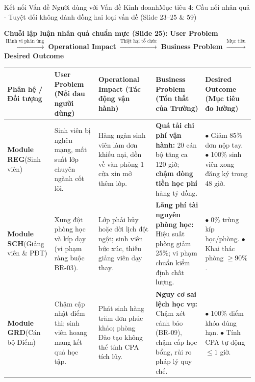 \documentclass[aspectratio=169, 10pt]{beamer}
\begin{document}
\begin{frame}[t]{Kết nối Vấn đề Người dùng với Vấn đề Kinh doanh}{Mục tiêu 4: Cầu nối nhân quả - Tuyệt đối không đánh đồng hai loại vấn đề (Slide 23--25 \& 59)}
  \vspace{-0.15cm}
  \begin{tcolorbox}[colback=NavyDark!5!white, colframe=NavyDark, arc=1mm, boxrule=0.5pt, left=2mm, right=2mm, top=1mm, bottom=1mm]
    \centering\scriptsize
    \textbf{Chuỗi lập luận nhân quả chuẩn mực (Slide 25):}\;
    {\color{NavyDark}\textbf{User Problem}} $\xrightarrow{\text{Hành vi phản ứng}}$ {\color{WarningAmber}\textbf{Operational Impact}} $\xrightarrow{\text{Thiệt hại tổ chức}}$ {\color{HustRed}\textbf{Business Problem}} $\xrightarrow{\text{Mục tiêu}}$ {\color{SecondaryTeal}\textbf{Desired Outcome}}
  \end{tcolorbox}
  \vspace{-0.15cm}

  \tiny
  \begin{tabularx}{\linewidth}{@{}P{2.2cm}YYYP{2.8cm}@{}}
    \toprule
    \textbf{Phân hệ / Đối tượng} & \textbf{User Problem (Nỗi đau người dùng)} & \textbf{Operational Impact (Tác động vận hành)} & \textbf{Business Problem (Tổn thất của Trường)} & \textbf{Desired Outcome (Mục tiêu đo lường)} \\
    \midrule
    \textbf{Module REG}\newline(Sinh viên) & 
    Sinh viên bị nghẽn mạng, mất suất lớp chuyên ngành cốt lõi. & 
    Hàng ngàn sinh viên làm đơn khiếu nại, dồn về văn phòng 1 cửa xin mở thêm lớp. & 
    \textbf{Quá tải chi phí vận hành:} 20 cán bộ tăng ca 120 giờ; \textbf{chậm dòng tiền học phí} hàng tỷ đồng. & 
    $\bullet$ Giảm 85\% đơn nộp tay.\newline
    $\bullet$ 100\% sinh viên xong đăng ký trong 48 giờ. \\
    \midrule
    \textbf{Module SCH}\newline(Giảng viên \& PĐT) & 
    Xung đột phòng học và kíp dạy (vi phạm ràng buộc BR-03). & 
    Lớp phải hủy hoặc dời lịch đột ngột; sinh viên bức xúc, thiếu giảng viên dạy thay. & 
    \textbf{Lãng phí tài nguyên phòng học:} Hiệu suất phòng giảm 25\%; vi phạm chuẩn kiểm định chất lượng. & 
    $\bullet$ 0\% trùng kíp học/phòng.\newline
    $\bullet$ Khai thác phòng $\ge 90\%$. \\
    \midrule
    \textbf{Module GRD}\newline(Cán bộ Điểm) & 
    Chậm cập nhật điểm thi; sinh viên hoang mang kết quả học tập. & 
    Phát sinh hàng trăm đơn phúc khảo; phòng Đào tạo không thể tính CPA tích lũy. & 
    \textbf{Nguy cơ sai lệch học vụ:} Chậm xét cảnh báo (BR-09), chậm cấp học bổng, rủi ro pháp lý quy chế. & 
    $\bullet$ 100\% điểm khóa đúng hạn.\newline
    $\bullet$ Tính CPA tự động $\le 1$ giờ. \\
    \bottomrule
  \end{tabularx}
\end{frame}
\end{document}
